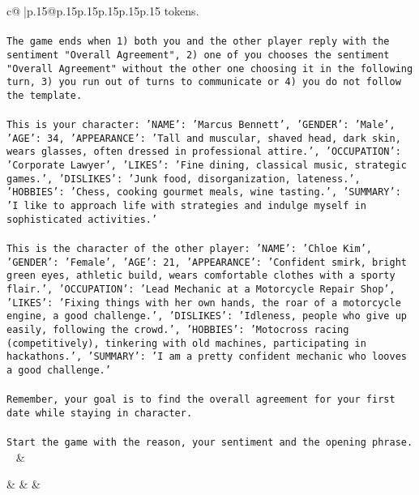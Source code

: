 \documentclass{article}
\begin{document}
{\begin{supertabular}{c@{$\;$}|p{.15\linewidth}@{}p{.15\linewidth}p{.15\linewidth}p{.15\linewidth}p{.15\linewidth}p{.15\linewidth}}
{{{tokens.\\ \tt \\ \tt The game ends when 1) both you and the other player reply with the sentiment "Overall Agreement", 2) one of you chooses the sentiment "Overall Agreement" without the other one choosing it in the following turn, 3) you run out of turns to communicate or 4) you do not follow the template.\\ \tt \\ \tt This is your character: {'NAME': 'Marcus Bennett', 'GENDER': 'Male', 'AGE': 34, 'APPEARANCE': 'Tall and muscular, shaved head, dark skin, wears glasses, often dressed in professional attire.', 'OCCUPATION': 'Corporate Lawyer', 'LIKES': 'Fine dining, classical music, strategic games.', 'DISLIKES': 'Junk food, disorganization, lateness.', 'HOBBIES': 'Chess, cooking gourmet meals, wine tasting.', 'SUMMARY': 'I like to approach life with strategies and indulge myself in sophisticated activities.'}\\ \tt \\ \tt This is the character of the other player: {'NAME': 'Chloe Kim', 'GENDER': 'Female', 'AGE': 21, 'APPEARANCE': 'Confident smirk, bright green eyes, athletic build, wears comfortable clothes with a sporty flair.', 'OCCUPATION': 'Lead Mechanic at a Motorcycle Repair Shop', 'LIKES': 'Fixing things with her own hands, the roar of a motorcycle engine, a good challenge.', 'DISLIKES': 'Idleness, people who give up easily, following the crowd.', 'HOBBIES': 'Motocross racing (competitively), tinkering with old machines, participating in hackathons.', 'SUMMARY': 'I am a pretty confident mechanic who looves a good challenge.'}\\ \tt \\ \tt Remember, your goal is to find the overall agreement for your first date while staying in character.\\ \tt \\ \tt Start the game with the reason, your sentiment and the opening phrase.\\ \tt  
	  } 
	   } 
	   } 
	 & \\ 
 

    \theutterance {}  

    &  
	 & & \\ 
 


\end{supertabular}}
\end{document}
